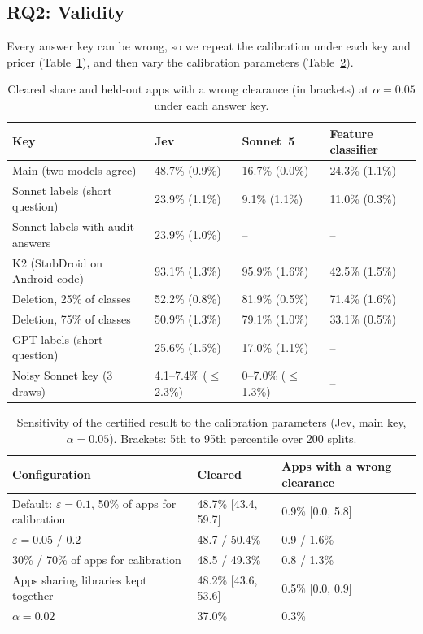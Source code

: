 \subsection{RQ2: Validity}
\label{sec:rq2}

Every answer key can be wrong, so we repeat the calibration under each key and pricer (Table~\ref{tab:keys}), and then vary the calibration parameters (Table~\ref{tab:unit}).

\begin{table}[t]
\caption{Cleared share and held-out apps with a wrong clearance (in brackets) at $\alpha=0.05$ under each answer key.}
\label{tab:keys}
\small
\begin{tabular}{@{}llll@{}}
\toprule
Key & Jev & Sonnet~5 & Feature classifier\\
\midrule
Main (two models agree) & 48.7\% (0.9\%) & 16.7\% (0.0\%) & 24.3\% (1.1\%)\\
Sonnet labels (short question) & 23.9\% (1.1\%) & 9.1\% (1.1\%) & 11.0\% (0.3\%)\\
Sonnet labels with audit answers & 23.9\% (1.0\%) & -- & --\\
K2 (StubDroid on Android code) & 93.1\% (1.3\%) & 95.9\% (1.6\%) & 42.5\% (1.5\%)\\
Deletion, 25\% of classes & 52.2\% (0.8\%) & 81.9\% (0.5\%) & 71.4\% (1.6\%)\\
Deletion, 75\% of classes & 50.9\% (1.3\%) & 79.1\% (1.0\%) & 33.1\% (0.5\%)\\
GPT labels (short question) & 25.6\% (1.5\%) & 17.0\% (1.1\%) & --\\
Noisy Sonnet key (3 draws) & 4.1--7.4\% ($\le$2.3\%) & 0--7.0\% ($\le$1.3\%) & --\\
\bottomrule
\end{tabular}
\end{table}

\begin{table}[t]
\caption{Sensitivity of the certified result to the calibration parameters (Jev, main key, $\alpha=0.05$). Brackets: 5th to 95th percentile over 200 splits.}
\label{tab:unit}
\small
\begin{tabular}{@{}lll@{}}
\toprule
Configuration & Cleared & Apps with a wrong clearance\\
\midrule
Default: $\varepsilon=0.1$, 50\% of apps for calibration & 48.7\% [43.4, 59.7] & 0.9\% [0.0, 5.8]\\
$\varepsilon=0.05$ / $0.2$ & 48.7 / 50.4\% & 0.9 / 1.6\%\\
30\% / 70\% of apps for calibration & 48.5 / 49.3\% & 0.8 / 1.3\%\\
Apps sharing libraries kept together & 48.2\% [43.6, 53.6] & 0.5\% [0.0, 0.9]\\
$\alpha=0.02$ & 37.0\% & 0.3\%\\
\bottomrule
\end{tabular}
\end{table}

